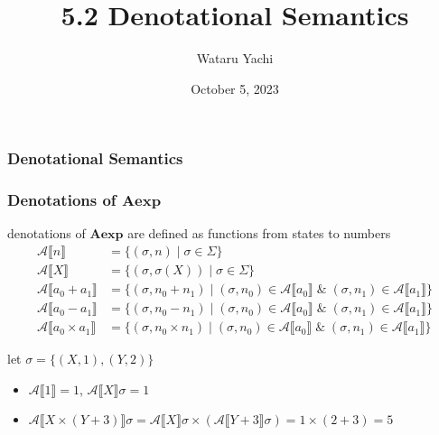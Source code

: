 \documentclass[12pt,aspectratio=169]{beamer}
\title{5.2 Denotational Semantics}
\author{Wataru Yachi}
\institute{JAIST}
\date{October 5, 2023}
\newcommand{\Aexp}{\mathbf{Aexp}}
\newcommand{\denoA}[1]{\mathcal{A} \llbracket #1 \rrbracket}
\begin{document}
\maketitle

\begin{frame}
    \frametitle{Denotational Semantics}

\end{frame}

\begin{frame}
    \frametitle{Denotations of $\Aexp$}
    denotations of $\Aexp$ are defined as functions from states to numbers
        \begin{align*}
            \denoA{n} & = \{(\sigma,n) \mid \sigma \in \Sigma \}\\
            \denoA{X} & = \{ (\sigma, \sigma(X)) \mid \sigma \in \Sigma \}\\
            \denoA{a_0 + a_1} & = \{(\sigma, n_0 + n_1) \mid
                (\sigma, n_0) \in \denoA{a_0} \; \& \; (\sigma, n_1) \in \denoA{a_1}\}\\
            \denoA{a_0 - a_1} & = \{(\sigma, n_0 - n_1) \mid
                (\sigma, n_0) \in \denoA{a_0} \; \& \; (\sigma, n_1) \in \denoA{a_1}\}\\
            \denoA{a_0 \times a_1} & = \{(\sigma, n_0 \times n_1) \mid
                (\sigma, n_0) \in \denoA{a_0} \; \& \; (\sigma, n_1) \in \denoA{a_1}\}
        \end{align*}
    \begin{example}
        let $\sigma = \{(X,1),(Y,2)\}$
        \begin{itemize}
            \item $\denoA{1} = 1$, $\denoA{X}\sigma = 1$
            \item $\denoA{X \times (Y + 3)}\sigma = \denoA{X}\sigma \times (\denoA{Y + 3}\sigma) = 1 \times (2 + 3) = 5$
        \end{itemize}
    \end{example}
\end{frame}
\end{document}
